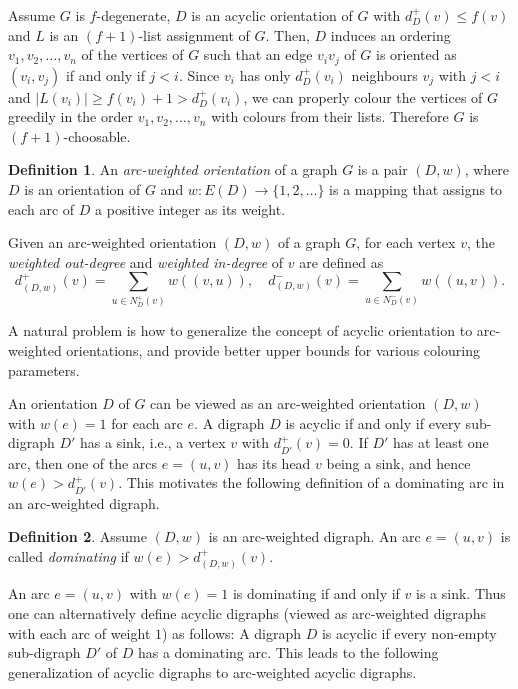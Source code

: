 \documentclass[11pt,a4paper]{article}
\theoremstyle{definition}
\newtheorem{definition}{Definition}
\begin{document}
  Assume $G$ is $f$-degenerate,  $D$ is an acyclic orientation  of  $G$ with $d_D^+(v ) \le f(v )$ and  $L$ is an $(f+1)$-list assignment of $G$. Then, $D$ induces an ordering $v_1,v_2, \ldots,v_n$ of the vertices of $G$ such that  an edge $v_iv_j$ of $G$ is oriented as $(v_i, v_j)$ if and only if $j < i$. Since $v_i$ has only $d_D^+(v_i )$  neighbours $v_j$ with $j < i$  and $|L(v_i)| \ge f(v_i)+1 > d_D^+(v_i)$, we can properly colour the vertices of $G$ greedily in the order $v_1,v_2, \ldots, v_n$  with colours from their lists. Therefore $G$ is $(f+1)$-choosable.



\begin{definition}
    \label{def-arcweighted}
    An {\em arc-weighted orientation}  of a graph $G$ is a pair $(D,w)$, where $D$ is an orientation of $G$   and $w: E(D) \to \{1,2,\ldots\}$ is a mapping that assigns to each arc of $D$ a positive integer as its weight.
\end{definition}
 
Given an arc-weighted orientation $(D,w)$ of a graph $G$, for each vertex $v$, the {\em weighted out-degree} and {\em weighted in-degree} of $v$ are defined as
$$d_{(D,w)}^+(v) = \sum_{u \in N_D^+(v)}w((v,u)), \quad d_{(D,w)}^-(v) = \sum_{u \in N_D^-(v)}w((u,v)).$$


A natural problem is how to generalize the concept of acyclic orientation to arc-weighted orientations, and provide better upper bounds for various colouring parameters. 

An orientation $D$ of $G$ can be viewed as an arc-weighted orientation $(D,w)$ with $w(e)=1$ for each arc $e$. A digraph $D$ is  acyclic if and only if every sub-digraph $D'$ has a sink, i.e., a vertex $v$ with $d_{D'}^+(v)=0$. If $D'$ has at least one arc, then one of the arcs $e=(u,v)$ has its head $v$ being a sink, and hence $w(e) > d_{D'}^+(v)$. This motivates the following definition of a dominating arc in an arc-weighted digraph.



\begin{definition}
    \label{def-dominating}
    Assume $(D,w)$ is an arc-weighted digraph. An arc $e=(u,v)$ is called {\em dominating} if $w(e) > d_{(D,w)}^+(v)$. 
\end{definition}

An arc $e=(u,v)$ with $w(e)=1$ is dominating if and only if $v$ is a sink. Thus one can alternatively  define acyclic digraphs (viewed as arc-weighted digraphs with each arc of weight $1$) as follows: 
A digraph $D$ is acyclic if every non-empty sub-digraph $D'$ of $D$ has a dominating arc. This leads to the following generalization of acyclic digraphs to arc-weighted acyclic digraphs. 
   
\end{document}
